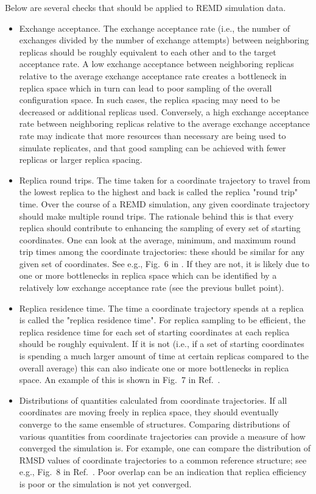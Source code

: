 Below are several checks that should be applied to REMD simulation data.

\begin{itemize}
  \item Exchange acceptance. The exchange acceptance rate (i.e., the number of exchanges divided by the number of exchange attempts) between neighboring replicas should be roughly equivalent to each other and to the target acceptance rate. A low exchange acceptance between neighboring replicas relative to the average exchange acceptance rate creates a bottleneck in replica space which in turn can lead to poor sampling of the overall configuration space.  In such cases, the replica spacing may need to be decreased or additional replicas used.  Conversely, a high exchange acceptance rate between neighboring replicas relative to the average exchange acceptance rate may indicate that more resources than necessary are being used to simulate replicates, and that good sampling can be achieved with fewer replicas or larger replica spacing.
  \item Replica round trips. The time taken for a coordinate trajectory to travel from the lowest replica to the highest and back is called the replica "round trip" time. Over the course of a REMD simulation, any given coordinate trajectory should make multiple round trips. The rationale behind this is that every replica should contribute to enhancing the sampling of every set of starting coordinates.
One can look at the average, minimum, and maximum round trip times among the coordinate trajectories: these should be similar for any given set of coordinates. See e.g., Fig.\ 6 in \citep{Roe2014}. %
If they are not, it is likely due to one or more bottlenecks in replica space which can be identified by a relatively low exchange acceptance rate (see the previous bullet point).
  \item Replica residence time. The time a coordinate trajectory spends at a replica is called the "replica residence time". For replica sampling to be efficient, the replica residence time for each set of starting coordinates at each replica should be roughly equivalent. If it is not (i.e., if a set of starting coordinates is spending a much larger amount of time at certain replicas compared to the overall average) this can also indicate one or more bottlenecks in replica space. An example of this is shown in Fig.\ 7 in Ref.\ \citep{Roe2014}.
  \item Distributions of quantities calculated from coordinate trajectories. If all coordinates are moving freely in replica space, they should eventually converge to the same ensemble of structures. Comparing distributions of various quantities from coordinate trajectories can provide a measure of how converged the simulation is. For example, one can compare the distribution of RMSD values of coordinate trajectories to a common reference structure; see e.g., Fig.\ 8 in Ref.\ \citep{Henriksen2013}. Poor overlap can be an indication that replica efficiency is poor or the simulation is not yet converged.
\end{itemize}

